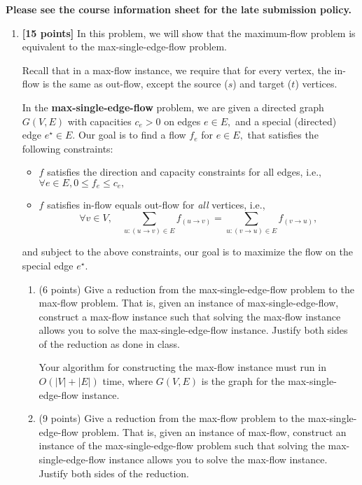 \documentclass{assignment-373}
\begin{document}
\think

\textbf{Please see the course information sheet for the late submission
  policy.}

\begin{enumerate}
\item \textbf{[15 points]}
  In this problem, we will show that the maximum-flow problem is
  equivalent to the max-single-edge-flow problem.

  Recall that in a max-flow instance, we require that for every
  vertex, the in-flow is the same as out-flow, except the source ($s$)
  and target ($t$) vertices.

  In the \textbf{max-single-edge-flow} problem, we are given a
  directed graph $G(V, E)$ with capacities $c_e > 0$ on edges
  $e \in E,$ and a special (directed) edge $e^{\star} \in E.$ Our goal
  is to find a flow $f_e$ for $e \in E,$ that satisfies the following
  constraints:
  \begin{itemize}
  \item $f$ satisfies the direction and capacity constraints for all
    edges, i.e., $\forall e \in E, 0 \le f_e \le c_e,$ 
  \item $f$ satisfies in-flow equals out-flow for \textit{all}
    vertices, i.e.,
    \[ \forall v \in V, \quad \sum_{u: (u \to v) \in E} f_{(u \to v)}
      = \sum_{u: (v \to u) \in E} f_{(v \to u)},
    \]
  \end{itemize}
  and subject to the above constraints, our goal is to maximize the
  flow on the special edge $e^{\star}.$

  \begin{enumerate}
  \item (6 points) Give a reduction from the {max-single-edge-flow}
    problem to the max-flow problem. That is, given an instance of
    max-single-edge-flow, construct a max-flow instance such that
    solving the max-flow instance allows you to solve the
    max-single-edge-flow instance.  Justify both sides of the
    reduction as done in class.

    Your algorithm for constructing the max-flow instance must run in
    $O(|V|+|E|)$ time, where $G(V, E)$ is the graph for the
    max-single-edge-flow instance.
    
  \item (9 points) Give a reduction from the max-flow problem to the
    {max-single-edge-flow} problem. That is, given an instance of
    max-flow, construct an instance of the max-single-edge-flow
    problem such that solving the {max-single-edge-flow} instance
    allows you to solve the max-flow instance. Justify both sides of
    the reduction.


\end{enumerate}
\end{enumerate}
\end{document}
